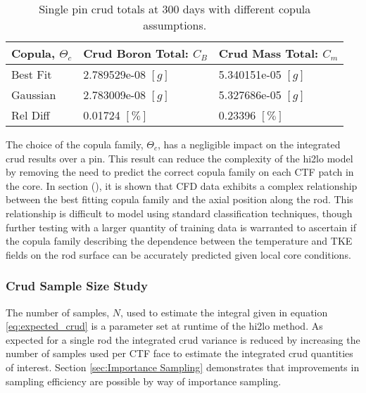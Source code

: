 \begin{table}[h]
    \begin{center}
        \caption[Crud totals with different copula assumptions.]{Single pin crud totals at 300 days with different copula assumptions.}
        \begin{tabular}[h]{|l | l | l |}
            \hline
            Copula, $\Theta_c$ & Crud Boron Total: $C_B$ & Crud Mass Total: $C_m$ \\
            \hline
            Best Fit &  2.789529e-08 $[g]$ & 5.340151e-05 $[g]$ \\
            Gaussian &  2.783009e-08 $[g]$ & 5.327686e-05 $[g]$ \\
            \hline
            Rel Diff &  0.01724 $[\%]$ & 0.23396 $[\%]$ \\
            \hline
        \end{tabular}
        \label{tab:crud_totals_copula}
    \end{center}
\end{table}

The choice of the copula family, $\Theta_c$, has a negligible impact on the integrated crud results over a pin.  This result can reduce the complexity of the hi2lo model by removing the need to predict the correct copula family on each CTF patch in the core.  In section (), it is shown that CFD data exhibits a complex relationship between the best fitting copula family and the axial position along the rod.  This relationship is difficult to model using standard classification techniques, though further testing with a larger quantity of training data is warranted to ascertain if the copula family describing the dependence between the temperature and TKE fields on the rod surface can be accurately predicted given local core conditions.

\subsubsection{Crud Sample Size Study}

The number of samples, $N$, used to estimate the integral given in equation \ref{eq:expected_crud} is a parameter set at runtime of the hi2lo method.
As expected for a single rod the integrated crud variance is reduced by increasing the number of samples used per CTF face to estimate the integrated crud quantities of interest.   Section \ref{sec:Importance Sampling} demonstrates that improvements in sampling efficiency are possible by way of importance sampling.

